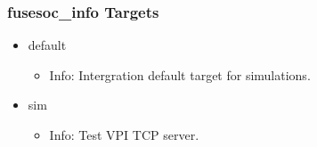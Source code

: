 \subsubsection{fusesoc\_info Targets}
\begin{itemize}
\item default
	\begin{itemize}
	\item[$\space$] Info: Intergration default target for simulations.
	\end{itemize}
\item sim
	\begin{itemize}
	\item[$\space$] Info: Test VPI TCP server.
	\end{itemize}
\end{itemize}
